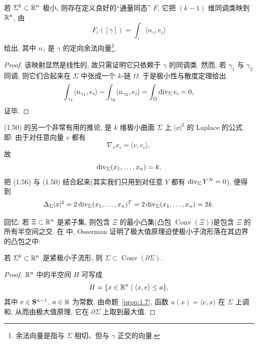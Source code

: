 \begin{corollary}
\label{cor:1.8}
若 $\Sigma^k\subset\mathbb{R}^n$ 极小, 则存在定义良好的``通量同态'' $F$, 它把
$(k-1)$ 维同调类映到 $\mathbb{R}^n$, 由
\begin{equation}
F_i([\gamma])=\int_{\gamma}\langle n_{\gamma},e_i\rangle
\label{eq:1.53}
\end{equation}
给出, 其中 $n_{\gamma}$ 是 $\gamma$ 的定向余法向量\footnote{余法向量是指与
$\Sigma$ 相切、但与 $\gamma$ 正交的向量.}.
\end{corollary}

\begin{proof}
该映射显然是线性的, 故只需证明它只依赖于 $\gamma$ 的同调类. 然而, 若
$\gamma_1$ 与 $\gamma_2$ 同调, 则它们合起来在 $\Sigma$ 中张成一个 $k$-链
$\Omega$. 于是极小性与散度定理给出
\begin{equation}
\int_{\gamma_1}\langle n_{\gamma_1},e_i\rangle
 -\int_{\gamma_2}\langle n_{\gamma_2},e_i\rangle
 =\int_{\Omega}\operatorname{div}_{\Sigma}e_i=0,
\label{eq:1.54}
\end{equation}
证毕.
\end{proof}

(1.50) 的另一个非常有用的推论, 是 $k$ 维极小曲面 $\Sigma$ 上 $|x|^2$ 的
Laplace 的公式. 即: 由于对任意向量 $v$ 都有
\begin{equation}
\nabla_v x_i=\langle v,e_i\rangle,
\label{eq:1.55}
\end{equation}
故
\begin{equation}
\operatorname{div}_{\Sigma}(x_1,\dots,x_n)=k.
\label{eq:1.56}
\end{equation}
把 (1.56) 与 (1.50) 结合起来(其实我们只用到对任意 $Y$ 都有
$\operatorname{div}_{\Sigma}Y^{N}=0$), 便得到
\begin{equation}
\Delta_{\Sigma}|x|^2
 =2\operatorname{div}_{\Sigma}(x_1,\dots,x_n)^{T}
 =2\operatorname{div}_{\Sigma}(x_1,\dots,x_n)=2k.
\label{eq:1.57}
\end{equation}

回忆: 若 $\Xi\subset\mathbb{R}^n$ 是紧子集, 则包含 $\Xi$ 的最小凸集(凸包
$\operatorname{Conv}(\Xi)$)是包含 $\Xi$ 的所有半空间之交. 在 \cite{Os6} 中,
Osserman 证明了极大值原理迫使极小子流形落在其边界的凸包之中:

\begin{proposition}
\label{prop:1.9}
若 $\Sigma^k\subset\mathbb{R}^n$ 是紧极小子流形, 则
$\Sigma\subset\operatorname{Conv}(\partial\Sigma)$.
\end{proposition}

\begin{proof}
$\mathbb{R}^n$ 中的半空间 $H$ 可写成
\begin{equation}
H=\{x\in\mathbb{R}^n\mid\langle x,e\rangle\leq a\},
\label{eq:1.58}
\end{equation}
其中 $e\in\mathbf{S}^{n-1}$, $a\in\mathbb{R}$ 为常数. 由命题~\ref{prop:1.7}, 函数
$u(x)=\langle e,x\rangle$ 在 $\Sigma$ 上调和, 从而由极大值原理, 它在
$\partial\Sigma$ 上取到最大值.
\end{proof}

